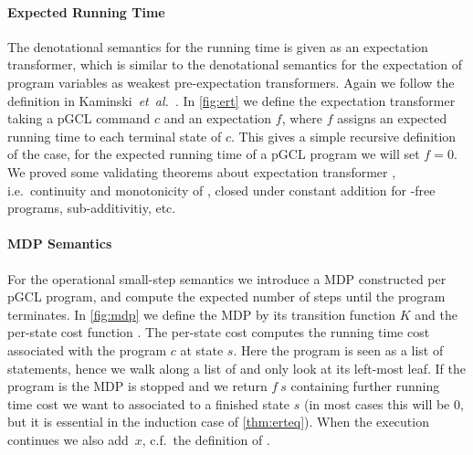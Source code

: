 \documentclass[a4paper]{llncs}
\newcommand{\etal}{\emph{et~al.}}
\begin{document}
\paragraph{Expected Running Time}

The denotational semantics for the running time is given as an expectation transformer, which is similar to the denotational semantics for the expectation of program variables as weakest pre-expectation transformers.
Again we follow the definition in Kaminski~\etal~\cite{kaminski2016ert}.
In \autoref{fig:ert} we define the expectation transformer  taking a pGCL command $c$ and an expectation $f$, where $f$ assigns an expected running time to each terminal state of $c$.
This gives a simple recursive definition of the  case, for the expected running time of a pGCL program we will set $f = 0$.
We proved some validating theorems about expectation transformer , i.e.~continuity and monotonicity of , closed under constant addition for -free programs, sub-additivitiy, etc.  

\paragraph{MDP Semantics}\label{sec:mdp}

For the operational small-step semantics we introduce a MDP constructed per pGCL program, and compute the expected number of steps until the program terminates.
In \autoref{fig:mdp} we define the MDP by its transition function $K$ and the per-state cost function .
The per-state cost  computes the running time cost associated with the program $c$ at state $s$.
Here the program is seen as a list of statements, hence we walk along a list of  and only look at its left-most leaf.
If the program is  the MDP is stopped and we return $f~s$ containing further running time cost we want to associated to a finished state $s$ (in most cases this will be $0$, but it is essential in the induction case of \autoref{thm:erteq}).
When the execution continues we also add~$x$, c.f.~the definition of .
\end{document}
